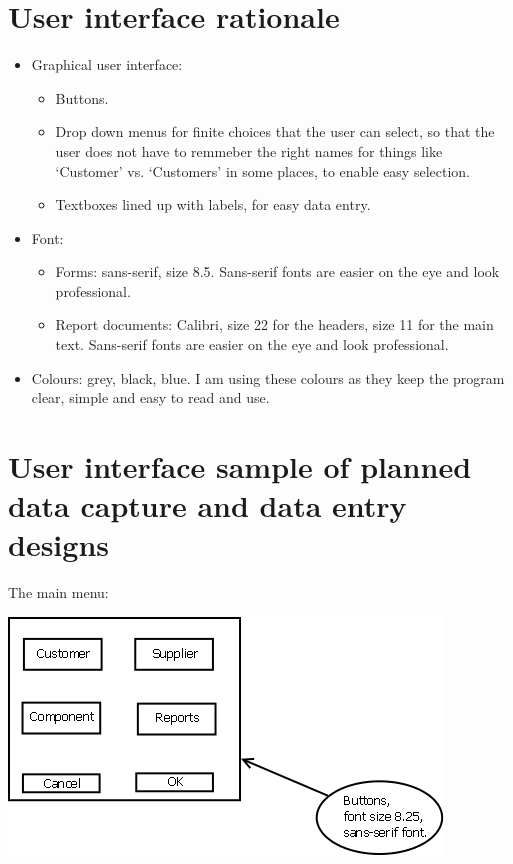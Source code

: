 	\section{User interface rationale}
\begin{itemize}
	\item{Graphical user interface:}
	\begin{itemize}
		\item{Buttons.}
		\item{Drop down menus for finite choices that the user can select, so that the user does not have to remmeber the right names for things like `Customer' vs. `Customers' in some places, to enable easy selection.}
		\item{Textboxes lined up with labels, for easy data entry.}
	\end{itemize}
	\item{Font:}
	\begin{itemize}
		\item{Forms: sans-serif, size 8.5.  Sans-serif fonts are easier on the eye and look professional.}
		\item{Report documents: Calibri, size 22 for the headers, size 11 for the main text.  Sans-serif fonts are easier on the eye and look professional.}
	\end{itemize}
	\item{Colours: grey, black, blue.  I am using these colours as they keep the program clear, simple and easy to read and use.}
\end{itemize}
	\section{User interface sample of planned data capture and data entry designs}
The main menu:

\begin{center}\includegraphics[scale=0.5]{mainmenudesignoriginal.png}\end{center}
	
